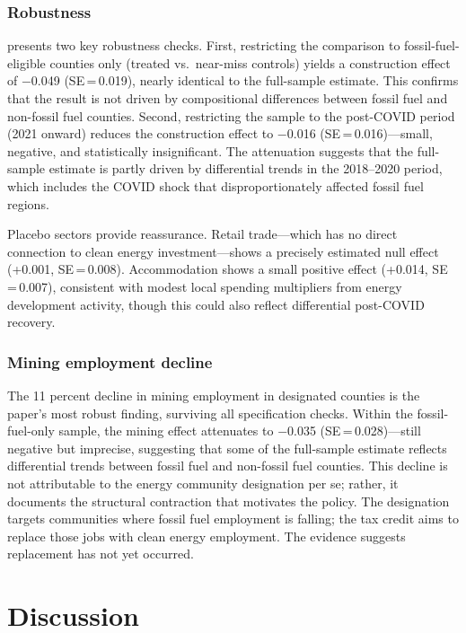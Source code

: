 \documentclass[12pt]{article}
\begin{document}


\subsubsection*{Robustness}
 presents two key robustness checks. First, restricting the comparison to fossil-fuel-eligible counties only (treated vs.\ near-miss controls) yields a construction effect of $-$0.049 (SE\,=\,0.019), nearly identical to the full-sample estimate. This confirms that the result is not driven by compositional differences between fossil fuel and non-fossil fuel counties. Second, restricting the sample to the post-COVID period (2021 onward) reduces the construction effect to $-$0.016 (SE\,=\,0.016)---small, negative, and statistically insignificant. The attenuation suggests that the full-sample estimate is partly driven by differential trends in the 2018--2020 period, which includes the COVID shock that disproportionately affected fossil fuel regions.

Placebo sectors provide reassurance. Retail trade---which has no direct connection to clean energy investment---shows a precisely estimated null effect (+0.001, SE\,=\,0.008). Accommodation shows a small positive effect (+0.014, SE\,=\,0.007), consistent with modest local spending multipliers from energy development activity, though this could also reflect differential post-COVID recovery.



\subsubsection*{Mining employment decline}
The 11 percent decline in mining employment in designated counties is the paper's most robust finding, surviving all specification checks. Within the fossil-fuel-only sample, the mining effect attenuates to $-$0.035 (SE\,=\,0.028)---still negative but imprecise, suggesting that some of the full-sample estimate reflects differential trends between fossil fuel and non-fossil fuel counties. This decline is not attributable to the energy community designation per se; rather, it documents the structural contraction that motivates the policy. The designation targets communities where fossil fuel employment is falling; the tax credit aims to replace those jobs with clean energy employment. The evidence suggests replacement has not yet occurred.


\section{Discussion}
\label{sec:discussion}
\end{document}

